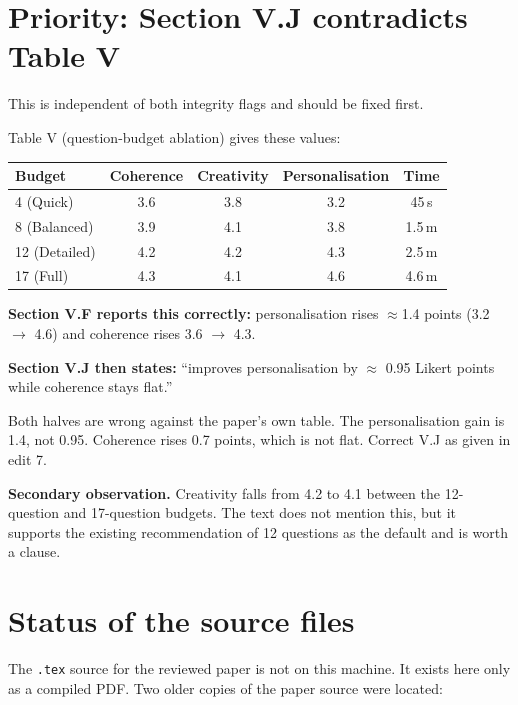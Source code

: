 \documentclass[11pt,a4paper]{article}
\begin{document}
\section{Priority: Section V.J contradicts Table V}

This is independent of both integrity flags and should be fixed first.

Table V (question-budget ablation) gives these values:

\begin{center}
\begin{tabular}{@{}lcccc@{}}
\toprule
\textbf{Budget} & \textbf{Coherence} & \textbf{Creativity} & \textbf{Personalisation} & \textbf{Time} \\
\midrule
4 (Quick)     & 3.6 & 3.8 & 3.2 & 45\,s \\
8 (Balanced)  & 3.9 & 4.1 & 3.8 & 1.5\,m \\
12 (Detailed) & 4.2 & 4.2 & 4.3 & 2.5\,m \\
17 (Full)     & 4.3 & 4.1 & 4.6 & 4.6\,m \\
\bottomrule
\end{tabular}
\end{center}

\noindent
\textbf{Section V.F reports this correctly:} personalisation rises
$\approx$1.4 points (3.2 $\rightarrow$ 4.6) and coherence rises
3.6 $\rightarrow$ 4.3.

\vspace{4pt}
\noindent
\textbf{Section V.J then states:} ``improves personalisation by $\approx$ 0.95
Likert points while coherence stays flat.''

\vspace{4pt}
\noindent
Both halves are wrong against the paper's own table. The personalisation gain is
1.4, not 0.95. Coherence rises 0.7 points, which is not flat. Correct V.J as
given in edit 7.

\vspace{6pt}
\noindent
\textbf{Secondary observation.} Creativity falls from 4.2 to 4.1 between the
12-question and 17-question budgets. The text does not mention this, but it
supports the existing recommendation of 12 questions as the default and is worth
a clause.

\section{Status of the source files}

The \texttt{.tex} source for the reviewed paper is not on this machine. It
exists here only as a compiled PDF. Two older copies of the paper source were
located:
\end{document}
